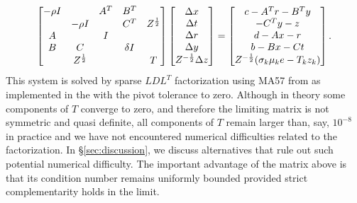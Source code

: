 \documentclass{amsart}
\begin{document}
\begin{equation}
  \label{eq:newton-sys-slack}
  \begin{bmatrix}
    -\rho I &              & A^T & B^T      & \\
            & -\rho I      &     & C^T      & Z^{\frac12} \\
     A      &              & I   &          & \\
     B      &  C           &     & \delta I & \\
            &  Z^{\frac12} &     &          & T
  \end{bmatrix}
  \begin{bmatrix}
    \Delta x \\ \Delta t \\ \Delta r \\ \Delta y \\ Z^{-\frac12} \Delta z
  \end{bmatrix}
  =
  \begin{bmatrix}
    c - A^T r - B^T y \\
    -C^T y - z \\
    d - Ax - r \\
    b - Bx - Ct \\
    Z^{-\frac12} (\sigma_k \mu_k e - T_k z_k)
  \end{bmatrix}.
\end{equation}
This system is solved by  sparse $LDL^T$ factorization using
\textsf{MA57} from \cite{duff-2004} as implemented in the \cite{HSL} with  the pivot tolerance to zero. Although in theory some components of $T$
 converge to zero, and therefore the limiting matrix is not symmetric
and quasi definite, all components of $T$ remain larger than, say, $10^{-8}$ in
practice and we have not encountered numerical difficulties related to the
factorization. In \S\ref{sec:discussion}, we discuss alternatives that rule out
such potential numerical difficulty. The important advantage of the
 matrix above is that its condition number remains uniformly bounded
provided strict complementarity holds in the limit.
\end{document}
